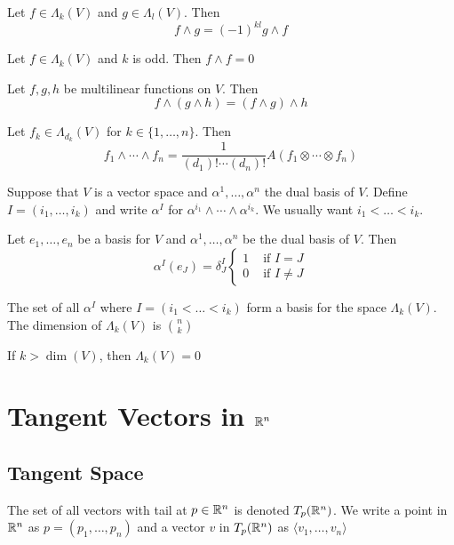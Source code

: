 \documentclass[a4paper]{article}
\begin{document}
\begin{prp} Let $f\in\Lambda_k(V)$ and $g\in\Lambda_l(V)$. Then $$f\wedge g=(-1)^{kl}g\wedge f$$
\end{prp}

\begin{crl} Let $f\in\Lambda_k(V)$ and $k$ is odd. Then $f\wedge f=0$
\end{crl}

\begin{prp} Let $f,g,h$ be multilinear functions on $V$. Then $$f\wedge(g\wedge h)=(f\wedge g)\wedge h$$
\end{prp}

\begin{prp} Let $f_k\in\Lambda_{d_k}(V)$ for $k\in\{1,\dots,n\}$. Then $$f_1\wedge\cdots\wedge f_n=\frac{1}{(d_1)!\cdots(d_n)!}A(f_1\otimes\cdots\otimes f_n)$$
\end{prp}

\begin{defn} Suppose that $V$ is a vector space and $\alpha^1,\dots,\alpha^n$ the dual basis of $V$. Define $I=(i_1,\dots,i_k)$ and write $\alpha^I$ for $\alpha^{i_1}\wedge\cdots\wedge\alpha^{i_k}$. We usually want $i_1<\dots<i_k$. 
\end{defn}

\begin{lmm} Let $e_1,\dots,e_n$ be a basis for $V$ and $\alpha^1,\dots,\alpha^n$ be the dual basis of $V$. Then $$\alpha^I(e_J)=\delta_J^I\begin{cases}
1 & \text{ if }I=J\\
0 & \text{ if }I\neq J
\end{cases}$$
\end{lmm}

\begin{prp} The set of all $\alpha^I$ where $I=(i_1<\dots<i_k)$ form a basis for the space $\Lambda_k(V)$. The dimension of $\Lambda_k(V)$ is $\binom{n}{k}$
\end{prp}

\begin{crl} If $k>\dim(V)$, then $\Lambda_k(V)=0$
\end{crl}

\pagebreak
\section{Tangent Vectors in $\mathbb{R}^n$}
\subsection{Tangent Space}
\begin{defn} The set of all vectors with tail at $p\in\mathbb{R}^n$ is denoted $T_p(\mathbb{R}^n)$. We write a point in $\mathbb{R}^n$ as $p=(p_1,\dots,p_n)$ and a vector $v$ in $T_p(\mathbb{R}^n)$ as $\langle v_1,\dots,v_n\rangle$
\end{defn}
\end{document}
